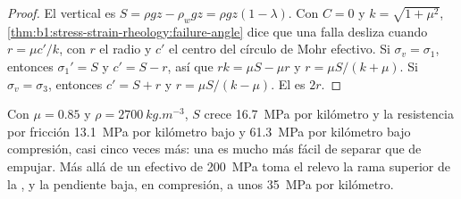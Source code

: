 \begin{proof}
El  vertical es $S = \rho g z - \rho_w g z = \rho g z(1-\lambda)$.
Con $C = 0$ y $k = \sqrt{1+\mu^2}$, \cref{thm:b1:stress-strain-rheology:failure-angle}
dice que una falla desliza cuando $r = \mu c'/k$, con $r$ el radio y $c'$ el
centro del círculo de Mohr efectivo. Si $\sigma_v = \sigma_1$, entonces
$\sigma_1' = S$ y $c' = S - r$, así que $rk = \mu S - \mu r$ y
$r = \mu S/(k+\mu)$. Si $\sigma_v = \sigma_3$, entonces $c' = S + r$ y
$r = \mu S/(k-\mu)$. El  es $2r$.
\end{proof}

Con $\mu = 0.85$ y $\rho = \qty{2700}{kg.m^{-3}}$, $S$ crece \qty{16.7}{MPa} por kilómetro y la resistencia por fricción \qty{13.1}{MPa} por kilómetro bajo
 y \qty{61.3}{MPa} por kilómetro bajo compresión, casi cinco veces más: una  es mucho más fácil de separar que de empujar. Más allá de un
 efectivo de \qty{200}{MPa} toma el relevo la rama superior de la , y la pendiente baja, en compresión, a unos \qty{35}{MPa} por kilómetro.

